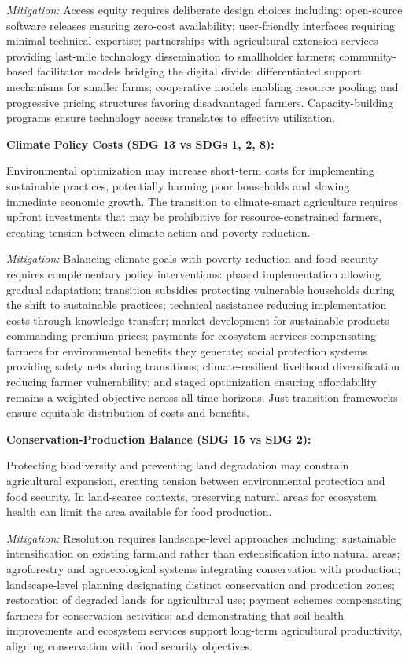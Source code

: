 \documentclass{oqireport}
\begin{document}
\textit{Mitigation:} Access equity requires deliberate design choices including: open-source software releases ensuring zero-cost availability; user-friendly interfaces requiring minimal technical expertise; partnerships with agricultural extension services providing last-mile technology dissemination to smallholder farmers; community-based facilitator models bridging the digital divide; differentiated support mechanisms for smaller farms; cooperative models enabling resource pooling; and progressive pricing structures favoring disadvantaged farmers. Capacity-building programs ensure technology access translates to effective utilization.

\textbf{Climate Policy Costs (SDG 13 vs SDGs 1, 2, 8):}

Environmental optimization may increase short-term costs for implementing sustainable practices, potentially harming poor households and slowing immediate economic growth. The transition to climate-smart agriculture requires upfront investments that may be prohibitive for resource-constrained farmers, creating tension between climate action and poverty reduction.

\textit{Mitigation:} Balancing climate goals with poverty reduction and food security requires complementary policy interventions: phased implementation allowing gradual adaptation; transition subsidies protecting vulnerable households during the shift to sustainable practices; technical assistance reducing implementation costs through knowledge transfer; market development for sustainable products commanding premium prices; payments for ecosystem services compensating farmers for environmental benefits they generate; social protection systems providing safety nets during transitions; climate-resilient livelihood diversification reducing farmer vulnerability; and staged optimization ensuring affordability remains a weighted objective across all time horizons. Just transition frameworks ensure equitable distribution of costs and benefits.

\textbf{Conservation-Production Balance (SDG 15 vs SDG 2):}

Protecting biodiversity and preventing land degradation may constrain agricultural expansion, creating tension between environmental protection and food security. In land-scarce contexts, preserving natural areas for ecosystem health can limit the area available for food production.

\textit{Mitigation:} Resolution requires landscape-level approaches including: sustainable intensification on existing farmland rather than extensification into natural areas; agroforestry and agroecological systems integrating conservation with production; landscape-level planning designating distinct conservation and production zones; restoration of degraded lands for agricultural use; payment schemes compensating farmers for conservation activities; and demonstrating that soil health improvements and ecosystem services support long-term agricultural productivity, aligning conservation with food security objectives.
\end{document}
